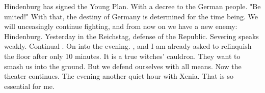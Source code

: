 Hindenburg has signed the Young Plan. With a decree to the German people. "Be united!" With that, the destiny of Germany is determined for the time being. We will unceasingly continue fighting, and from now on we have a new enemy: Hindenburg. Yesterday in the Reichstag, defense of the Republic. Severing speaks weakly. Continual . On into the evening. , and I am already asked to relinquish the floor after only 10 minutes. It is a true witches' cauldron. They want to smash us into the ground. But we defend ourselves with all means. Now the theater continues. The evening another quiet hour with Xenia. That is so essential for me.
